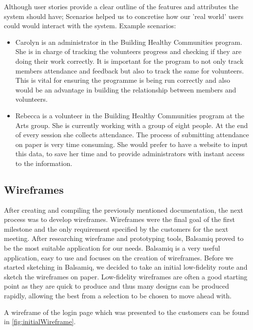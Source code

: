 \documentclass{l3proj}
\begin{document}
Although user stories provide a clear outline of the features and attributes the system should have; Scenarios helped us to concretise how our 'real world' users could would interact with the system.
Example scenarios:
\begin{itemize}
\item Carolyn is an administrator in the Building Healthy Communities program. She is in charge of tracking the volunteers progress and checking if they are doing their work correctly. It is important for the program to not only track members attendance and feedback but also to track the same for volunteers. This is vital for ensuring the programme is being run correctly and also would be an advantage in building the relationship between members and volunteers.

\item Rebecca is a volunteer in the Building Healthy Communities program at the Arts group. She is currently working with a group of eight people. At the end of every session she collects attendance. The process of submitting attendance on paper is very time consuming. She would prefer to have a website to input this data, to save her time and to provide administrators with instant access to the information.

\end{itemize}

\subsection{Wireframes}
\label{wireframes}

After creating and compiling the previously mentioned documentation, the next process was to develop wireframes. Wireframes were the final goal of the first milestone and the only requirement specified by the customers for the next meeting. After researching wireframe and prototyping tools, Balsamiq proved to be the most suitable application for our needs. Balsamiq is a very useful application, easy to use and focuses on the creation of wireframes. Before we started sketching in Balsamiq, we decided to take an initial low-fidelity route and sketch the wireframes on paper. Low-fidelity wireframes are often a good starting point as they are quick to produce and thus many designs can be produced rapidly, allowing the best from a selection to be chosen to move ahead with.

A wireframe of the login page which was presented to the customers can be found in \autoref{fig:initialWireframe}.
\end{document}
